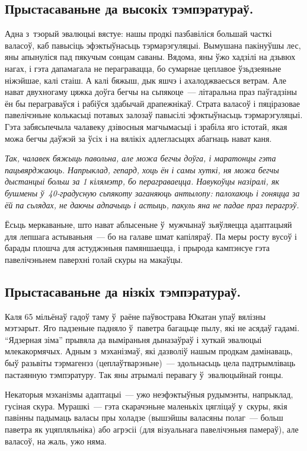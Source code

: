 \subsection*{Прыстасаваньне да высокіх тэмпэратураў.}

Адна з~тэорый эвалюцыі вястуе: нашы продкі пазбавіліся большай часткі валасоў, каб павысіць эфэктыўнасьць тэрмарэгуляцыі. Вымушана пакінуўшы лес, яны апынуліся пад пякучым сонцам саваны. Вядома, яны ўжо хадзілі на дзьвюх нагах, і гэта дапамагала не перагравацца, бо сумарнае цеплавое ўзьдзеяньне ніжэйшае, калі стаіш. А калі бяжыш, дык яшчэ і ахалоджваесься ветрам. Але нават двухногаму цяжка доўга бегчы на сьпякоце~--- літаральна праз паўгадзіны ён бы пераграваўся і рабіўся здабычай драпежнікаў. Страта валасоў і пяціразовае павелічэньне колькасьці потавых залозаў павысілі эфэктыўнасьць тэрмарэгуляцыі. Гэта забясьпечыла чалавеку дзівосныя магчымасьці і зрабіла яго істотай, якая можа бегчы даўжэй за ўсіх і на вялікіх адлегласьцях абагнаць нават каня.

\emph{Так, чалавек бяжыць павольна, але можа бегчы доўга, і маратонцы гэта пацьвярджаюць. Напрыклад, гепард, хоць ён і самы хуткі, ня можа бегчы дыстанцыі больш за 1 кілямэтр, бо пераграваецца. Навукоўцы назіралі, як бушмены ў~40-градусную сьпякоту заганяюць антылопу: палохаюць і гоняцца за ёй па сьлядах, не даючы адпачыць і астыць, пакуль яна не падае праз перагрэў.}

Ёсьць меркаваньне, што нават аблысеньне ў~мужчынаў зьяўляецца адаптацыяй для лепшага астываньня~--- бо на галаве шмат капіляраў. Па меры росту вусоў і барады плошча для астуджэньня памяншаецца, і прырода кампэнсуе гэта павелічэньнем паверхні голай скуры на макаўцы.

\subsection*{Прыстасаваньне да нізкіх тэмпэратураў.}

Каля 65 мільёнаў гадоў таму ў~раёне паўвострава Юкатан упаў вялізны мэтэарыт. Яго падзеньне падняло ў~паветра багацьце пылу, які не асядаў гадамі. ``Ядзерная зіма'' прывяла да выміраньня дыназаўраў і хуткай эвалюцыі млекакормячых. Адным з~мэханізмаў, які дазволіў нашым продкам дамінаваць, быў разьвіты тэрмагенэз (цеплаўтварэньне)~--- здольнасьць цела падтрымліваць пастаянную тэмпэратуру. Так яны атрымалі перавагу ў~эвалюцыйнай гонцы.

Некаторыя мэханізмы адаптацыі~--- ужо неэфэктыўныя рудымэнты, напрыклад, гусіная скура. Мурашкі~--- гэта скарачэньне маленькіх цягліцаў у~скуры, якія павінны падымаць валасы пры холадзе (вышэйшы валасяны полаг~--- больш паветра як уцяпляльніка) або агрэсіі (для візуальнага павелічэньня памераў), але валасоў, на жаль, ужо няма.


